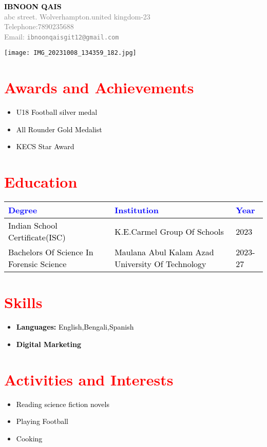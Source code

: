 \documentclass[a4paper,10pt]{article}
\begin{document}
\begin{center}
    \textcolor{black}{\textbf{\Huge IBNOON QAIS}} \\
    \vspace{0.2cm}
    \textcolor{gray}{abc street. Wolverhampton.united kingdom-23} \\
    \textcolor{gray}{Telephone:7890235688} \\
    \textcolor{gray}{Email: \texttt{ibnoonqaisgit12@gmail.com}} \\
\end{center}

\vspace{0.5cm}

\begin{flushright}
    \texttt{[image: IMG\_20231008\_134359\_182.jpg]}
\end{flushright}

\section*{\textcolor{red}{Awards and Achievements}}
\begin{itemize}
    \item \textcolor{black}{U18 Football silver medal}
    \item \textcolor{black}{All Rounder Gold Medalist}
    \item \textcolor{black}{KECS Star Award}
\end{itemize}

\section*{\textcolor{red}{Education}}
\begin{tabular}{ | m{5cm} | m{5cm} | m{3cm} | }
    \hline
    \textbf{\textcolor{blue}{Degree}} & \textbf{\textcolor{blue}{Institution}} & \textbf{\textcolor{blue}{Year}} \\
    \hline
    \textcolor{black}{Indian School Certificate(ISC)} & \textcolor{black}{K.E.Carmel Group Of Schools} & \textcolor{black}{2023} \\
    \hline
    \textcolor{black}{Bachelors Of Science In Forensic Science} & \textcolor{black}{Maulana Abul Kalam Azad     University Of Technology} & \textcolor{black}{2023-27} \\
    \hline
\end{tabular}

\section*{\textcolor{red}{Skills}}
\begin{itemize}
    \item \textbf{\textcolor{black}{Languages:}} \textcolor{black}{English,Bengali,Spanish}
    \item \textbf{\textcolor{black}{Digital Marketing}}
\end{itemize}

\section*{\textcolor{red}{Activities and Interests}}
\begin{itemize}
    \item \textcolor{black}{Reading science fiction novels}
    \item \textcolor{black}{Playing Football}
    \item \textcolor{black}{Cooking}
\end{itemize}
\end{document}
